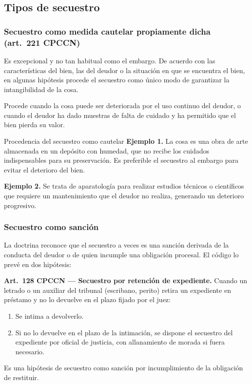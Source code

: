 \documentclass[12pt,oneside]{book}
\begin{document}
\subsection{Tipos de secuestro}

\subsubsection{Secuestro como medida cautelar propiamente dicha (art.\ 221 CPCCN)}

Es excepcional y no tan habitual como el embargo. De acuerdo con las características del bien, las del deudor o la situación en que se encuentra el bien, en algunas hipótesis procede el secuestro como único modo de garantizar la intangibilidad de la cosa.

Procede cuando la cosa puede ser deteriorada por el uso continuo del deudor, o cuando el deudor ha dado muestras de falta de cuidado y ha permitido que el bien pierda su valor.

\begin{example}{Procedencia del secuestro como cautelar}
\textbf{Ejemplo 1.} La cosa es una obra de arte almacenada en un depósito con humedad, que no recibe los cuidados indispensables para su preservación. Es preferible el secuestro al embargo para evitar el deterioro del bien.

\textbf{Ejemplo 2.} Se trata de aparatología para realizar estudios técnicos o científicos que requiere un mantenimiento que el deudor no realiza, generando un deterioro progresivo.
\end{example}

\subsubsection{Secuestro como sanción}

La doctrina reconoce que el secuestro a veces es una sanción derivada de la conducta del deudor o de quien incumple una obligación procesal. El código lo prevé en dos hipótesis:

\textbf{Art.\ 128 CPCCN --- Secuestro por retención de expediente.} Cuando un letrado o un auxiliar del tribunal (escribano, perito) retira un expediente en préstamo y no lo devuelve en el plazo fijado por el juez:
\begin{enumerate}
    \item Se intima a devolverlo.
    \item Si no lo devuelve en el plazo de la intimación, se dispone el secuestro del expediente por oficial de justicia, con allanamiento de morada si fuera necesario.
\end{enumerate}
Es una hipótesis de secuestro como sanción por incumplimiento de la obligación de restituir.
\end{document}
